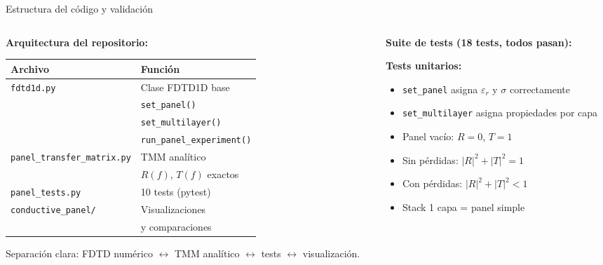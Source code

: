 \documentclass[aspectratio=169,11pt]{beamer}
\begin{document}
\begin{frame}{Estructura del c\'odigo y validaci\'on}

\begin{columns}[T]
\begin{column}{0.48\textwidth}
\textbf{Arquitectura del repositorio:}

\vspace{0.5em}
\begin{tabular}{@{}ll@{}}
\toprule
\textbf{Archivo} & \textbf{Funci\'on} \\
\midrule
\texttt{fdtd1d.py} & Clase FDTD1D base \\
 & \texttt{set\_panel()} \\
 & \texttt{set\_multilayer()} \\
 & \texttt{run\_panel\_experiment()} \\
\midrule
\texttt{panel\_transfer\_matrix.py} & TMM anal\'itico \\
 & $R(f)$, $T(f)$ exactos \\
\midrule
\texttt{panel\_tests.py} & 10 tests (pytest) \\
\midrule
\texttt{conductive\_panel/} & Visualizaciones \\
 & y comparaciones \\
\bottomrule
\end{tabular}

\vspace{0.5em}
{\small Separaci\'on clara: FDTD num\'erico $\leftrightarrow$ TMM anal\'itico $\leftrightarrow$ tests $\leftrightarrow$ visualizaci\'on.}
\end{column}

\begin{column}{0.50\textwidth}
\textbf{Suite de tests (18 tests, todos pasan):}

\vspace{0.3em}
{\small
\textbf{Tests unitarios:}
\begin{itemize}\setlength\itemsep{0pt}
  \item \texttt{set\_panel} asigna $\varepsilon_r$ y $\sigma$ correctamente
  \item \texttt{set\_multilayer} asigna propiedades por capa
  \item Panel vac\'io: $R=0$, $T=1$
  \item Sin p\'erdidas: $|R|^2+|T|^2=1$
  \item Con p\'erdidas: $|R|^2+|T|^2<1$
  \item Stack 1 capa = panel simple
\end{itemize}

}
\end{column}
\end{columns}
\end{frame}
\end{document}
